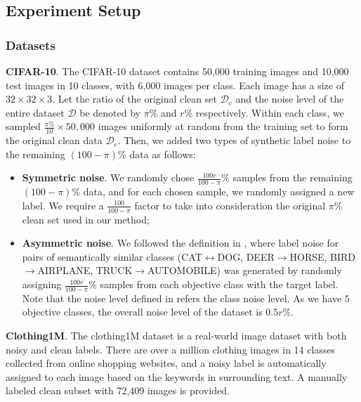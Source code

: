 \documentclass[conference]{IEEEtran}
\begin{document}
\label{experiment}
\subsection{Experiment Setup}
\subsubsection{Datasets}
\label{dataset}
\textbf{CIFAR-10}.
The CIFAR-10 dataset \cite{krizhevsky2009learning} contains  50,000 training images and 10,000 test images in 10 classes, with 6,000 images per class. Each image has a size of $32\times 32\times 3$. 
Let the ratio of the original clean set $\mathcal{D}_c$ and the noise level of the entire dataset $\mathcal{D}$ be denoted by $\pi$\% and $r$\% respectively. 
Within each class, we sampled $\frac{\pi\%}{10}\times50,000$ images uniformly at random from the training set to form the original clean data $\mathcal{D}_c$.  
Then, we added two types of synthetic label noise to the remaining $(100-\pi)$\% data as follows:  
\begin{itemize}
\item \textbf{Symmetric noise}. We randomly chose $\frac{100r}{100-\pi}\%$ samples from the remaining $(100-\pi)\%$ data, and for each chosen sample, we randomly assigned a new label.
We require a $\frac{100}{100-\pi}$ factor to take into consideration the original $\pi$\% clean set used in our method;
\item \textbf{Asymmetric noise}. We followed the definition in \cite{patrini2017making}, where label noise for pairs of semantically similar classes (CAT$\leftrightarrow$DOG,  DEER$\rightarrow$HORSE, BIRD$\rightarrow$AIRPLANE, TRUCK$\rightarrow$AUTOMOBILE) was generated by randomly assigning $\frac{100r}{100-\pi}\%$ samples from each objective class with the target label. Note that the noise level defined in \cite{patrini2017making} refers the class noise level. 
As we have $5$ objective classes, the overall noise level of the dataset is $0.5r\%$.
\end{itemize} 

\textbf{Clothing1M}.
The clothing1M dataset \cite{xiao2015learning} is a real-world image dataset with both noisy and clean labels. 
There are over a million clothing images in 14 classes collected from online shopping websites, and a noisy label is automatically assigned to each image based on the keywords in surrounding text. 
A manually labeled clean subset with 72,409 images is provided. 
\end{document}
